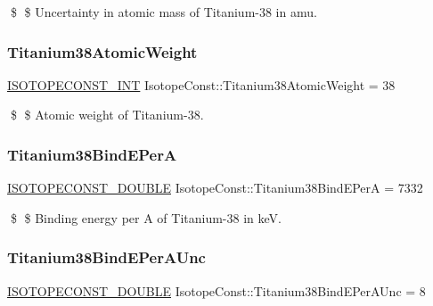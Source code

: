 \$ \$ Uncertainty in atomic mass of Titanium-\/38 in amu. \mbox{\label{group___isotope_const-_titanium-_ti38_gaf88ccf0f37670bb4047493ab51420144}} 
\subsubsection{\texorpdfstring{Titanium38\+Atomic\+Weight}{Titanium38AtomicWeight}}
{\footnotesize\ttfamily \mbox{\hyperlink{group___isotope_const-_macros_ga5f18360b3e99483a35c32d789e62621c}{I\+S\+O\+T\+O\+P\+E\+C\+O\+N\+S\+T\+\_\+\+I\+NT}} Isotope\+Const\+::\+Titanium38\+Atomic\+Weight = 38}

\$ \$ Atomic weight of Titanium-\/38. \mbox{\label{group___isotope_const-_titanium-_ti38_ga9c0b9f06b5e54209a29239c1abc44dc4}} 
\subsubsection{\texorpdfstring{Titanium38\+Bind\+E\+PerA}{Titanium38BindEPerA}}
{\footnotesize\ttfamily \mbox{\hyperlink{group___isotope_const-_macros_ga8f45a7272ce02c0b4c65c44636ed719a}{I\+S\+O\+T\+O\+P\+E\+C\+O\+N\+S\+T\+\_\+\+D\+O\+U\+B\+LE}} Isotope\+Const\+::\+Titanium38\+Bind\+E\+PerA = 7332}

\$ \$ Binding energy per A of Titanium-\/38 in keV. \mbox{\label{group___isotope_const-_titanium-_ti38_ga6d70519f53528850986c45f756ef6e16}} 
\subsubsection{\texorpdfstring{Titanium38\+Bind\+E\+Per\+A\+Unc}{Titanium38BindEPerAUnc}}
{\footnotesize\ttfamily \mbox{\hyperlink{group___isotope_const-_macros_ga8f45a7272ce02c0b4c65c44636ed719a}{I\+S\+O\+T\+O\+P\+E\+C\+O\+N\+S\+T\+\_\+\+D\+O\+U\+B\+LE}} Isotope\+Const\+::\+Titanium38\+Bind\+E\+Per\+A\+Unc = 8}

